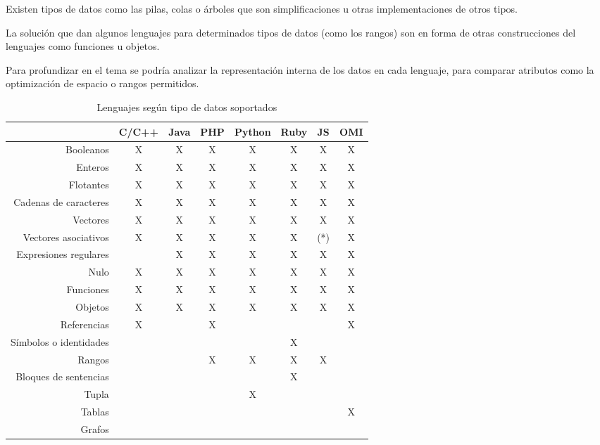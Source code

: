 Existen tipos de datos como las pilas, colas o árboles que son simplificaciones u otras 
implementaciones de otros tipos.

La solución que dan algunos lenguajes para determinados tipos de datos (como los rangos) son en forma 
de otras construcciones del lenguajes como funciones u objetos.

Para profundizar en el tema se podría analizar la representación interna de los
datos en cada lenguaje, para comparar atributos como la optimización de espacio o rangos permitidos. 

 \FloatBarrier
\begin{table}[h]
 \begin{center}
\begin{tabular}{|r|c|c|c|c|c|c|c|} \hline
 & C/C++ & Java & PHP  & Python & Ruby & JS & OMI \\ \hline
Booleanos & X & X & X & X & X & X & X \\ \hline
Enteros & X & X& X & X & X & X & X \\ \hline
Flotantes & X & X & X & X & X & X & X \\ \hline
Cadenas de caracteres & X & X & X & X & X & X & X \\ \hline
Vectores  & X & X & X & X & X & X & X \\ \hline
Vectores asociativos & X & X & X & X & X & (*) & X \\ \hline 
Expresiones regulares &  & X & X & X & X & X & X \\ \hline
Nulo & X & X & X & X & X & X & X \\ \hline
Funciones & X & X & X & X & X & X & X \\ \hline
Objetos & X & X & X & X & X & X & X \\ \hline
Referencias & X & & X & & & & X \\ \hline
Símbolos o identidades & & & & & X &  &  \\ \hline
Rangos  & & & X & X & X & X &  \\ \hline
Bloques de sentencias & & & & & X & &  \\ \hline 
Tupla  & & & & X & & &  \\ \hline
Tablas &  &  &  &  &  &  & X \\ \hline
Grafos &  &  &  &  &  &  &  \\ \hline
\end{tabular}
\caption{Lenguajes según tipo de datos soportados}
\end{center}
\end{table}
\FloatBarrier

